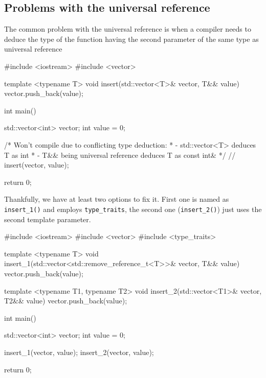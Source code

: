 \documentclass[../main]{subfiles}
\begin{document}
\subsection{Problems with the universal reference}
    The common problem with the universal reference is when a compiler needs to deduce the type of the function having the second parameter of the same type as
universal reference
\begin{Code}
    #include <iostream>
    #include <vector>
    
    template <typename T>
    void insert(std::vector<T>& vector, T&& value)
    {
        vector.push_back(value);
    }
    
    int main()
    {
        std::vector<int> vector;
        int value = 0;
        
        /* Won't compile due to conflicting type deduction:
         *  - std::vector<T> deduces T as int
         * - T&& being universal reference deduces T as const int&
        */
        // insert(vector, value);
    
        return 0;
    }
\end{Code}

    Thankfully, we have at least two options to fix it. First one is named as \texttt{insert\_1()} and employs \texttt{type\_traits}, the second
one (\texttt{insert\_2()}) just uses the second template parameter.
\begin{Code}
    #include <iostream>
    #include <vector>
    #include <type_traits>
    
    template <typename T>
    void insert_1(std::vector<std::remove_reference_t<T>>& vector,
                  T&& value)
    {
        vector.push_back(value);
    }
    
    template <typename T1, typename T2>
    void insert_2(std::vector<T1>& vector, T2&& value)
    {
        vector.push_back(value);
    }
    
    int main()
    {
        std::vector<int> vector;
        int value = 0;
        
        insert_1(vector, value);
        insert_2(vector, value);
    
        return 0;
    }
\end{Code}
\end{document}
